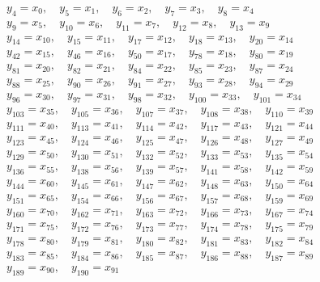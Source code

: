 \begin{align*}
 &y_{4}=x_{0},\quad y_{5}=x_{1},\quad y_{6}=x_{2},\quad y_{7}=x_{3},\quad y_{8}=x_{4} \\
 &y_{9}=x_{5},\quad y_{10}=x_{6},\quad y_{11}=x_{7},\quad y_{12}=x_{8},\quad y_{13}=x_{9} \\
 &y_{14}=x_{10},\quad y_{15}=x_{11},\quad y_{17}=x_{12},\quad y_{18}=x_{13},\quad y_{20}=x_{14} \\
 &y_{42}=x_{15},\quad y_{46}=x_{16},\quad y_{50}=x_{17},\quad y_{78}=x_{18},\quad y_{80}=x_{19} \\
 &y_{81}=x_{20},\quad y_{82}=x_{21},\quad y_{84}=x_{22},\quad y_{85}=x_{23},\quad y_{87}=x_{24} \\
 &y_{88}=x_{25},\quad y_{90}=x_{26},\quad y_{91}=x_{27},\quad y_{93}=x_{28},\quad y_{94}=x_{29} \\
 &y_{96}=x_{30},\quad y_{97}=x_{31},\quad y_{98}=x_{32},\quad y_{100}=x_{33},\quad y_{101}=x_{34} \\
 &y_{103}=x_{35},\quad y_{105}=x_{36},\quad y_{107}=x_{37},\quad y_{108}=x_{38},\quad y_{110}=x_{39} \\
 &y_{111}=x_{40},\quad y_{113}=x_{41},\quad y_{114}=x_{42},\quad y_{117}=x_{43},\quad y_{121}=x_{44} \\
 &y_{123}=x_{45},\quad y_{124}=x_{46},\quad y_{125}=x_{47},\quad y_{126}=x_{48},\quad y_{127}=x_{49} \\
 &y_{129}=x_{50},\quad y_{130}=x_{51},\quad y_{132}=x_{52},\quad y_{133}=x_{53},\quad y_{135}=x_{54} \\
 &y_{136}=x_{55},\quad y_{138}=x_{56},\quad y_{139}=x_{57},\quad y_{141}=x_{58},\quad y_{142}=x_{59} \\
 &y_{144}=x_{60},\quad y_{145}=x_{61},\quad y_{147}=x_{62},\quad y_{148}=x_{63},\quad y_{150}=x_{64} \\
 &y_{151}=x_{65},\quad y_{154}=x_{66},\quad y_{156}=x_{67},\quad y_{157}=x_{68},\quad y_{159}=x_{69} \\
 &y_{160}=x_{70},\quad y_{162}=x_{71},\quad y_{163}=x_{72},\quad y_{166}=x_{73},\quad y_{167}=x_{74} \\
 &y_{171}=x_{75},\quad y_{172}=x_{76},\quad y_{173}=x_{77},\quad y_{174}=x_{78},\quad y_{175}=x_{79} \\
 &y_{178}=x_{80},\quad y_{179}=x_{81},\quad y_{180}=x_{82},\quad y_{181}=x_{83},\quad y_{182}=x_{84} \\
 &y_{183}=x_{85},\quad y_{184}=x_{86},\quad y_{185}=x_{87},\quad y_{186}=x_{88},\quad y_{187}=x_{89} \\
 &y_{189}=x_{90},\quad y_{190}=x_{91}
\end{align*}
